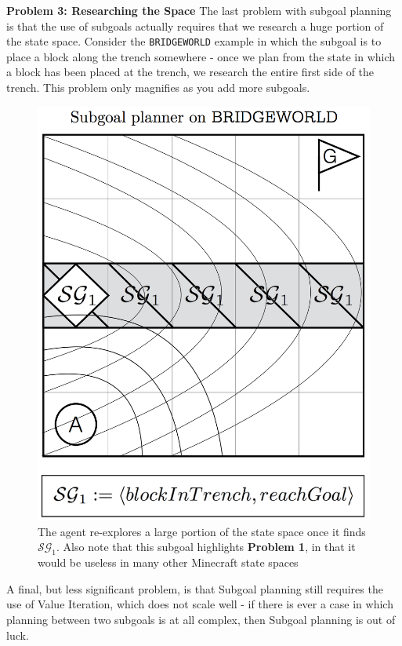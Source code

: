 \documentclass[]{article}
\begin{document}

{\bf Problem 3: Researching the Space} The last problem with subgoal planning 
is that the use of subgoals actually requires that we research a huge portion of 
the state space. Consider the \texttt{BRIDGEWORLD} example in which the 
subgoal is to place a block along the trench somewhere - once we plan from the 
state in which a block has been placed at the trench, we research the entire first 
side of the trench. This problem only magnifies as you add more subgoals.

\begin{figure}
\centering
\includegraphics[scale=0.22]{figures/bridgeworld_sg.png}
\caption{The agent re-explores a large portion of the state space 
once it finds $\mathcal{SG}_1$. Also note that this subgoal 
highlights {\bf Problem 1}, in that it would be useless in many other Minecraft state spaces}
\end{figure}


A final, but less significant problem, is that Subgoal planning still 
requires the use of Value Iteration, which does not scale well - if 
there is ever a case in which planning between two subgoals is 
at all complex, then Subgoal planning is out of luck.
\end{document}
